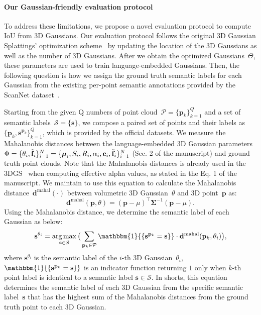 \paragraph{Our Gaussian-friendly evaluation protocol}
To address these limitations, we propose a novel evaluation protocol to compute IoU from 3D Gaussians. Our evaluation protocol follows the original 3D Gaussian Splattings' optimization scheme~\cite{3dgs} by updating the location of the 3D Gaussians as well as the number of 3D Gaussians. After we obtain the optimized Gaussians~$\Theta$, these parameters are used to train language-embedded Gaussians. Then, the following question is how we assign the ground truth semantic labels for each Gaussian from the existing per-point semantic annotations provided by the ScanNet dataset~\cite{dai2017scannet}.

Starting from the given Q numbers of point cloud~$\mathcal{P} = \{ \mathbf{p}_k \}_{k=1}^{Q}$
and a set of semantic labels~$\mathcal{S} = \{ \mathbf{s} \}$,
we compose a paired set of points and their labels as $\{ \mathbf{p}_k, \mathbf{s}^{\mathbf{p}_k} \}_{k=1}^{Q}$,
which is provided by the official datasets. We measure the Mahalanobis distances between the language-embedded 3D Gaussian parameters $\Phi = \{ \theta_i, \mathbf{\tilde f}_i \}_{i=1}^N = \{ \mbox{\boldmath $\mu$}_i, S_i, R_i, \alpha_i, \mathbf{c}_i, \mathbf{\tilde f}_i \}_{i=1}^N$
(Sec. 2 of the manuscript) and ground truth point clouds. Note that the Mahalanobis distances is already used in the 3DGS~\cite{3dgs} when computing effective alpha values, as stated in the Eq. 1 of the manuscript. We maintain to use this equation to calculate the Mahalanobis distance~$\mathbf{d}^\text{mahal}(\cdot)$ between volumetric 3D Gaussian~$\theta$ and 3D point~$\mathbf{p}$ as:
\begin{equation}
    \mathbf{d}^\text{mahal}(\mathbf{p}, \theta) = (\mathbf{p}-\mu)^\top\mathbf{\Sigma}^{-1}(\mathbf{p}-\mu).
    \label{eq:mahalanobis_distance}
\end{equation}
Using the Mahalanobis distance, we determine the semantic label of each Gaussian as below:
\begin{equation}
    \mathbf{s}^{\theta_i} = \mathop{\arg\max}_{\mathbf{s} \in \mathcal{S}} \big( \sum_{\mathbf{p}_k \in \mathcal{P}} \mathbbm{1}{\{ \mathbf{s}^{\mathbf{p}_k} = \mathbf{s} \}} \cdot \mathbf{d}^\text{mahal}(\mathbf{p}_k, \theta_i) \big),
     \label{eq:pseudo_labeling_Gaussians}
\end{equation}
where $\mathbf{s}^{\theta_i}$ is the semantic label of the $i$-th 3D Gaussian~$\theta_i$, $\mathbbm{1}{\{ \mathbf{s}^{\mathbf{p}_k} = \mathbf{s} \}}$ is an indicator function returning $1$ only when $k$-th point label is identical to a semantic label $\mathbf{s} \in \mathcal{S}$. In shorts, this equation determines the semantic label of each 3D Gaussian from the specific semantic label~$\mathbf{s}$ that has the highest sum of the Mahalanobis distances from the ground truth point to each 3D Gaussian.

